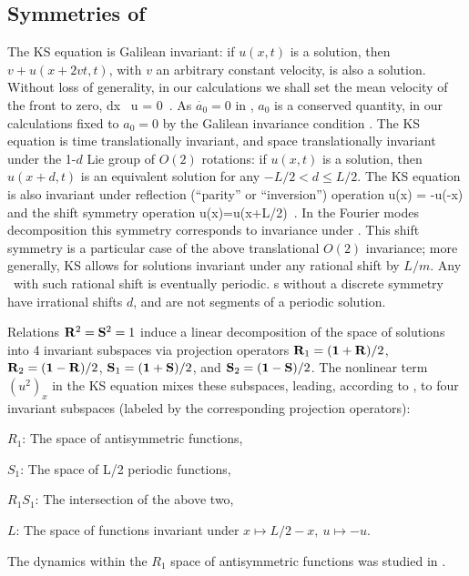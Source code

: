\subsection{Symmetries of \KSe}
\label{sec:KSeSymm}

The  KS equation is
Galilean invariant: if $u(x,t)$ is a solution, then
$v+u(x+2vt,t)$, with $v$ an arbitrary constant velocity, is also a solution.
Without loss of generality, in our calculations we shall set
the mean velocity of the  front to zero,
\beq
\int dx \, u = 0
\,.
As  $\dot{a_0}=0$ in ,
$a_0$ is a conserved quantity, in our calculations
fixed to $a_0=0$ by the Galilean invariance condition .
The KS equation   is time translationally invariant,
and
space translationally invariant
under the 1-$d$ Lie group of $O(2)$ rotations: if
$u(x,t)$ is a solution, then $u(x+d,t)$ is an equivalent
solution for any $-L/2 < d \leq L/2$.
The KS equation is also invariant under
reflection (``parity'' or ``inversion'') operation
\beq
\Refl u(x) = -u(-x)
and the shift symmetry operation
\beq
\Shift u(x)=u(x+L/2)
\,.
In the Fourier modes decomposition  this
symmetry corresponds to invariance under
.
This shift symmetry is a particular case of the
above translational $O(2)$ invariance; more generally,
KS allows for solutions invariant under any rational shift by
$L/m$. Any \rpo\ with such rational shift is eventually periodic.
\Rpo s without a discrete symmetry have irrational shifts
$d$, and are not segments of a periodic solution.


Relations $\mathbf{R}^2=\mathbf{S}^2=1$
induce a linear decomposition of the space of solutions into 4 invariant
subspaces via projection operators
$\mathbf{R}_1=(\mathbf 1+\mathbf{R})/2$,
$\mathbf{R}_2=(\mathbf 1-\mathbf{R})/2$,
$\mathbf{S}_1=(\mathbf 1+\mathbf{S})/2$, and
$\mathbf{S}_2=(\mathbf 1-\mathbf{S})/2$. The nonlinear term $(u^2)_x$ in the KS equation
mixes these subspaces, leading,
according to , to four invariant subspaces
(labeled by the corresponding projection operators):
\begin{romannum} %

 \item[$R_1$:] The space of antisymmetric functions,
 \item[$S_1$:] The space of L/2 periodic functions,
 \item[$R_1 S_1$:] The intersection of the above two,
 \item[$L$:] The space of functions invariant under $x\mapsto L/2-x,\ u\mapsto -u$.

\end{romannum} %
The dynamics within the $R_1$ space of antisymmetric functions
was studied in .


